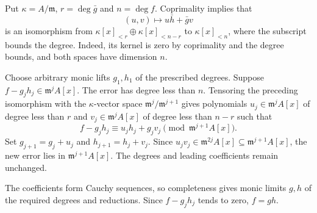 Put $\kappa=A/\mathfrak{m}$, $r=\deg\bar g$ and $n=\deg f$. Coprimality implies that
\[(u,v)\mapsto u\bar h+\bar g v\]
is an isomorphism from $\kappa[x]_{<r}\oplus\kappa[x]_{<n-r}$ to $\kappa[x]_{<n}$, where the subscript bounds the degree. Indeed, its kernel is zero by coprimality and the degree bounds, and both spaces have dimension $n$.

Choose arbitrary monic lifts $g_1,h_1$ of the prescribed degrees. Suppose $f-g_jh_j\in\mathfrak{m}^jA[x]$. The error has degree less than $n$. Tensoring the preceding isomorphism with the $\kappa$-vector space $\mathfrak{m}^j/\mathfrak{m}^{j+1}$ gives polynomials $u_j\in\mathfrak{m}^jA[x]$ of degree less than $r$ and $v_j\in\mathfrak{m}^jA[x]$ of degree less than $n-r$ such that
\[f-g_jh_j\equiv u_jh_j+g_jv_j\pmod{\mathfrak{m}^{j+1}A[x]}.\]
Set $g_{j+1}=g_j+u_j$ and $h_{j+1}=h_j+v_j$. Since $u_jv_j\in\mathfrak{m}^{2j}A[x]\subseteq\mathfrak{m}^{j+1}A[x]$, the new error lies in $\mathfrak{m}^{j+1}A[x]$. The degrees and leading coefficients remain unchanged.

The coefficients form Cauchy sequences, so completeness gives monic limits $g,h$ of the required degrees and reductions. Since $f-g_jh_j$ tends to zero, $f=gh$.
